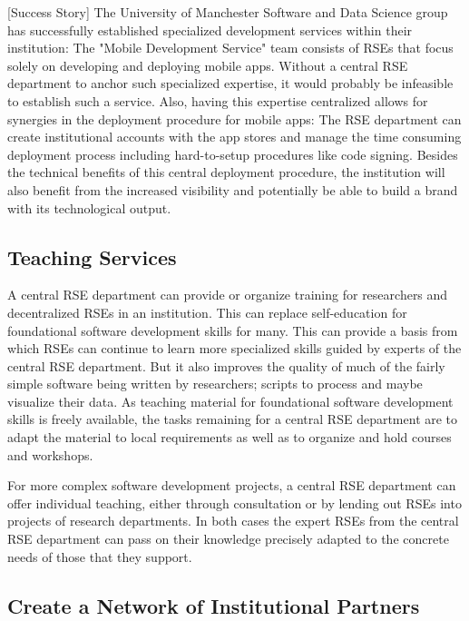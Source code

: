 \documentclass[a4paper]{article}
\begin{document}
[Success Story]
The University of Manchester Software and Data Science group has successfully established specialized development services within their institution:
The "Mobile Development Service" \autocite{manchester_mobile} team consists of RSEs that focus solely on developing and deploying mobile apps.
Without a central RSE department to anchor such specialized expertise, it would probably be infeasible to establish such a service.
Also, having this expertise centralized allows for synergies in the deployment procedure for mobile apps:
The RSE department can create institutional accounts with the app stores and manage the time consuming deployment process including hard-to-setup procedures like code signing.
Besides the technical benefits of this central deployment procedure, the institution will also benefit from the increased visibility and potentially be able to build a brand with its technological output.

\subsection{Teaching Services}
\label{sec:teaching}

A central RSE department can provide or organize training for researchers and decentralized RSEs in an institution.
This can replace self-education for foundational software development skills for many.
This can provide a basis from which RSEs can continue to learn more specialized skills guided by experts of the central RSE department.
But it also improves the quality of much of the fairly simple software being written by researchers; scripts to process and maybe visualize their data.
As teaching material for foundational software development skills is freely available,
the tasks remaining for a central RSE department are to adapt the material to local requirements as well as to organize and hold courses and workshops.

For more complex software development projects, a central RSE department can offer individual teaching, either through consultation or by lending out RSEs into projects of research departments.
In both cases the expert RSEs from the central RSE department can pass on their knowledge precisely adapted to the concrete needs of those that they support.

\subsection{Create a Network of Institutional Partners}
\label{sec:partners}
\end{document}
